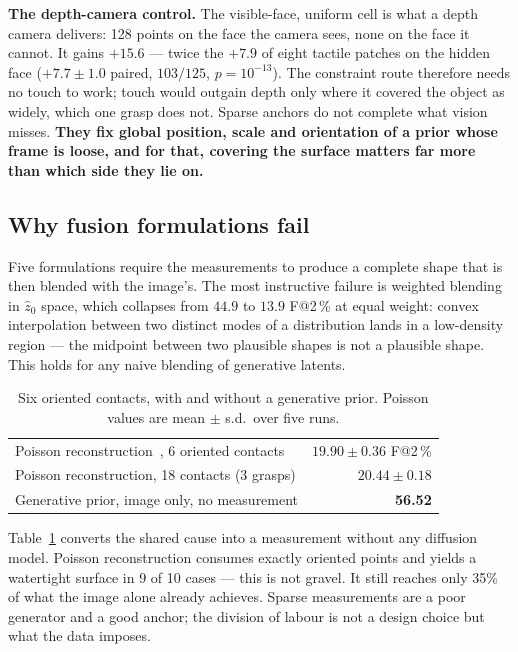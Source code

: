 \documentclass[conference]{IEEEtran}
\makeatletter
\newcommand{\gd}[1]{\textbf{#1}}
\newcommand{\Fs}{F@2\,\%}
\makeatother
\begin{document}
\textbf{The depth-camera control.} The visible-face, uniform cell is what a depth
camera delivers: 128 points on the face the camera sees, none on the face it cannot.
It gains $+15.6$ --- twice the $+7.9$ of eight tactile patches on the hidden face
($+7.7 \pm 1.0$ paired, $103/125$, $p = 10^{-13}$). The constraint route therefore
needs no touch to work; touch would outgain depth only where it covered the object as
widely, which one grasp does not. Sparse anchors do not complete what vision misses.
\textbf{They fix global position, scale and orientation of a prior whose frame is
loose, and for that, covering the surface matters far more than which side they lie
on.}

\subsection{Why fusion formulations fail}
\label{sec:fusions}

Five formulations require the measurements to produce a complete shape that is then
blended with the image's. The most instructive failure is weighted blending in
$\hat{z}_0$ space, which collapses from $44.9$ to $13.9$ \Fs{} at equal weight:
convex interpolation between two distinct modes of a distribution lands in a
low-density region --- the midpoint between two plausible shapes is not a plausible
shape. This holds for any naive blending of generative latents.

\begin{table}[t]
\centering
\caption{Six oriented contacts, with and without a generative prior. Poisson values are mean $\pm$ s.d.\ over five runs.}
\label{tab:poisson}
\begin{tabular}{lr}
\toprule
Poisson reconstruction~\cite{poisson}, 6 oriented contacts & $19.90 \pm 0.36$ \Fs \\
Poisson reconstruction, 18 contacts (3 grasps) & $20.44 \pm 0.18$ \\
\midrule
Generative prior, image only, no measurement & \gd{56.52} \\
\bottomrule
\end{tabular}
\end{table}

Table~\ref{tab:poisson} converts the shared cause into a measurement without any
diffusion model. Poisson reconstruction consumes exactly oriented points and yields a
watertight surface in 9 of 10 cases --- this is not gravel. It still reaches only
35\% of what the image alone already achieves. Sparse measurements are a poor
generator and a good anchor; the division of labour is not a design choice but what
the data imposes.
\end{document}
